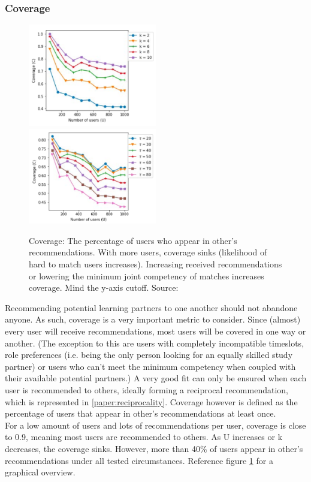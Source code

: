 \documentclass[conference]{IEEEtran}
\begin{document}
\subsubsection{Coverage} \label{paper:coverage}
\begin{figure}[!t]
	\includegraphics[width=0.5\textwidth]{g/CoverageUk.PNG}
	\includegraphics[width=0.5\textwidth]{g/CoverageUT.PNG}
	\caption{Coverage: The percentage of users who appear in other's recommendations. With more users, coverage sinks (likelihood of hard to match users increases). Increasing received recommendations or lowering the minimum joint competency of matches increases coverage. Mind the y-axis cutoff. Source: \cite{potts2018reciprocal}}
	\label{f:coverage}
\end{figure}
Recommending potential learning partners to one another should not abandone anyone. As such, coverage is a very important metric to consider. Since (almost) every user will receive recommendations, most users will be covered in one way or another. (The exception to this are users with completely incompatible timeslots, role preferences (i.e. being the only person looking for an equally skilled study partner) or users who can't meet the minimum competency when coupled with their available potential partners.) A very good fit can only be ensured when each user is recommended to others, ideally forming a reciprocal recommendation, which is represented in \ref{paper:reciprocality}. Coverage however is defined as the percentage of users that appear in other's recommendations at least once.\\
For a low amount of users and lots of recommendations per user, coverage is close to 0.9, meaning most users are recommended to others. As U increases or k decreases, the coverage sinks. However, more than 40\% of users appear in other's recommendations under all tested circumstances. Reference figure \ref{f:coverage} for a graphical overview.\\
\end{document}
